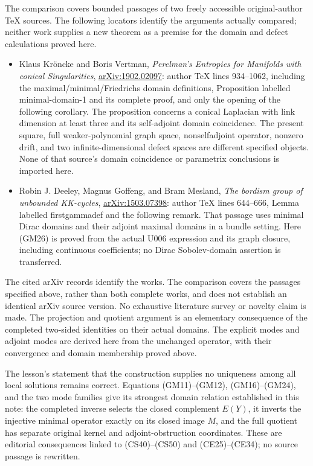 \documentclass[
  11pt,
]{article}
\providecommand{\tightlist}{%
  \setlength{\itemsep}{0pt}\setlength{\parskip}{0pt}}
\begin{document}
The comparison covers bounded passages of two freely accessible
original-author TeX sources. The following locators identify the
arguments actually compared; neither work supplies a new theorem as a
premise for the domain and defect calculations proved here.

\begin{itemize}
\tightlist
\item
  Klaus Kröncke and Boris Vertman, \emph{Perelman's Entropies for
  Manifolds with conical Singularities},
  \href{https://arxiv.org/abs/1902.02097}{arXiv:1902.02097}: author TeX
  lines 934--1062, including the maximal/minimal/Friedrichs domain
  definitions, Proposition labelled minimal-domain-1 and its complete
  proof, and only the opening of the following corollary. The
  proposition concerns a conical Laplacian with link dimension at least
  three and its self-adjoint domain coincidence. The present square,
  full weaker-polynomial graph space, nonselfadjoint operator, nonzero
  drift, and two infinite-dimensional defect spaces are different
  specified objects. None of that source's domain coincidence or
  parametrix conclusions is imported here.
\item
  Robin J. Deeley, Magnus Goffeng, and Bram Mesland, \emph{The bordism
  group of unbounded KK-cycles},
  \href{https://arxiv.org/abs/1503.07398}{arXiv:1503.07398}: author TeX
  lines 644--666, Lemma labelled firstgammadef and the following remark.
  That passage uses minimal Dirac domains and their adjoint maximal
  domains in a bundle setting. Here (GM26) is proved from the actual
  U006 expression and its graph closure, including continuous
  coefficients; no Dirac Sobolev-domain assertion is transferred.
\end{itemize}

The cited arXiv records identify the works. The comparison covers the
passages specified above, rather than both complete works, and does not
establish an identical arXiv source version. No exhaustive literature
survey or novelty claim is made. The projection and quotient argument is
an elementary consequence of the completed two-sided identities on their
actual domains. The explicit modes and adjoint modes are derived here
from the unchanged operator, with their convergence and domain
membership proved above.

The lesson's statement that the construction supplies no uniqueness
among all local solutions remains correct. Equations (GM11)--(GM12),
(GM16)--(GM24), and the two mode families give its strongest domain
relation established in this note: the completed inverse selects the
closed complement \(E(Y)\), it inverts the injective
minimal operator exactly on its closed image \(M\),
and the full quotient has separate original kernel and
adjoint-obstruction coordinates. These are editorial consequences linked
to (CS40)--(CS50) and (CE25)--(CE34); no source passage is rewritten.
\end{document}

